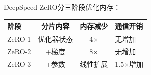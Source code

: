 DeepSpeed ZeRO分三阶段优化内存\cite{rajbhandari2024zero}：

\begin{table}[H]
\centering
\small
\begin{tabular}{lccl}
\toprule
\textbf{阶段} & \textbf{分片内容} & \textbf{内存减少} & \textbf{通信开销} \\
\midrule
ZeRO-1 & 优化器状态 & 4× & 无增加 \\
ZeRO-2 & +梯度 & 8× & 无增加 \\
ZeRO-3 & +参数 & 线性扩展 & 1.5×增加 \\
\bottomrule
\end{tabular}
\end{table}

